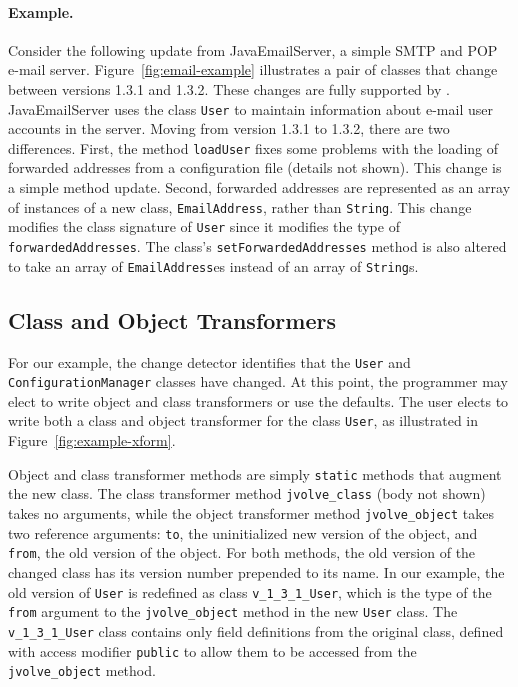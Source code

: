 \paragraph{Example.} 
Consider the following update from JavaEmailServer, a simple SMTP and
POP e-mail server.  Figure~\ref{fig:email-example}
illustrates a 
pair of classes that change between versions 1.3.1 and 1.3.2.  These
changes are fully supported by \DSU.  JavaEmailServer uses the class
\texttt{User} to maintain information about e-mail user accounts in the
server.  Moving from version 1.3.1 to 1.3.2, there are two
differences.  First, the method \texttt{loadUser} fixes some problems
with the loading of forwarded addresses from a configuration file
(details not shown).  This change is a simple method update.  Second,
forwarded addresses are represented as an array of instances of a new
class, \texttt{EmailAddress}, rather than \texttt{String}.  This change modifies
the class signature of \texttt{User} since it modifies the type of
\texttt{forwardedAddresses}.  The class's
\texttt{setForwardedAddresses} method is also altered to take an array of
\texttt{EmailAddress}es instead of an array of \texttt{String}s.


\subsection{Class and Object Transformers}
\label{subsec:transformers}

For our example, the \DSU{} change detector  identifies that
the \texttt{User} and \texttt{ConfigurationManager} classes have
changed.  At this point, the programmer may elect to write object
and class transformers or use the defaults.
The user elects to write both a class and object
transformer for the class \texttt{User}, as illustrated in
Figure~\ref{fig:example-xform}.

Object and class transformer methods are simply \texttt{static}
methods that augment the new class.  The class transformer method
\texttt{jvolve\_class} (body not shown) takes no arguments, while the
object transformer method \texttt{jvolve\_object} takes two reference
arguments: \texttt{to}, the uninitialized new version of the object,
and \texttt{from}, the old version of the object.  For both methods,
the old version of the changed class has its version number prepended to its
name.  In our example, the old version of \texttt{User} is redefined as
class \texttt{v\_1\_3\_1\_User}, which is the type of the \texttt{from}
argument to the \texttt{jvolve\_object} method in the new \texttt{User}
class. The \texttt{v\_1\_3\_1\_User} class contains only field definitions
from the original class, defined with access modifier \texttt{public} to
allow them to be accessed from the \texttt{jvolve\_object} method.


